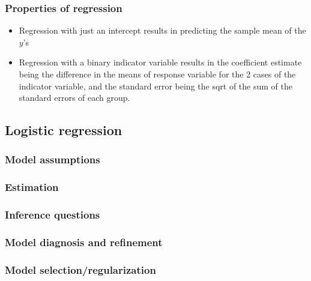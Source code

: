 \documentclass{article}
\begin{document}
\subsubsection{Properties of regression}
\begin{itemize}
\item Regression with just an intercept results in predicting the sample mean of the $y$'s
\item Regression with a binary indicator variable results in the coefficient estimate being the difference in the means of response variable for the 2 cases of the indicator variable, and the
  standard error being the sqrt of the sum of the standard errors of each group.
\end{itemize}

\subsection{Logistic regression}
\subsubsection{Model assumptions}
\subsubsection{Estimation}
\subsubsection{Inference questions}
\subsubsection{Model diagnosis and refinement}
\subsubsection{Model selection/regularization}

\end{document}
